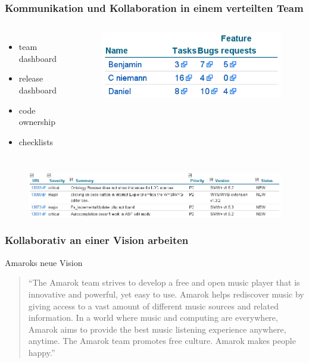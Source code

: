 \documentclass{beamer}
\begin{document}
\begin{frame}
\frametitle{Kommunikation und Kollaboration in einem verteilten Team}
\begin{columns}
   \begin{itemize}
     \item team dashboard
     \item release dashboard
     \item code ownership
     \item checklists
   \end{itemize}
   \begin{figure}
     \includegraphics[scale=0.4,keepaspectratio=true]{./TeamDashboardTable.png}
   \end{figure}
\end{columns}
   \begin{figure}
     \includegraphics[scale=0.45,keepaspectratio=true]{./bugListHalo.png}
   \end{figure}
\end{frame}

\begin{frame}
\frametitle{Kollaborativ an einer Vision arbeiten}
\begin{block}{Amaroks neue Vision}
\begin{quotation}``The Amarok team strives to develop a free and open music player that is innovative and powerful, yet easy to use. Amarok helps rediscover music by giving access to a vast amount of different music sources and related information. In a world where music and computing are everywhere, Amarok aims to provide the best music listening experience anywhere, anytime. The Amarok team promotes free culture. Amarok makes people happy.''\end{quotation}
\end{block}
\end{frame}
\end{document}
